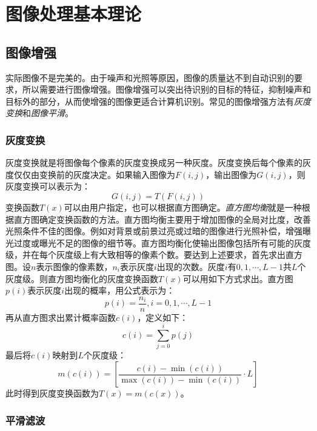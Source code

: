 
\chapter{图像处理基本理论}

\section{图像增强}

实际图像不是完美的。由于噪声和光照等原因，图像的质量达不到自动识别的要求，所以需要进行图像增强。图像增强可以突出待识别的目标的特征，抑制噪声和目标外的部分，从而使增强的图像更适合计算机识别。常见的图像增强方法有\emph{灰度变换}和\emph{图像平滑}。

\subsection{灰度变换}

灰度变换就是将图像每个像素的灰度变换成另一种灰度。灰度变换后每个像素的灰度仅仅由变换前的灰度决定。如果输入图像为$F(i,j)$，输出图像为$G(i,j)$，则灰度变换可以表示为：
\begin{equation}
  G(i,j)=T(F(i,j))
\end{equation}
变换函数$T(x)$可以由用户指定，也可以根据直方图确定。\emph{直方图均衡}就是一种根据直方图确定变换函数的方法。直方图均衡主要用于增加图像的全局对比度，改善光照条件不佳的图像。例如对背景或前景过亮或过暗的图像进行光照补偿，增强曝光过度或曝光不足的图像的细节等。直方图均衡化使输出图像包括所有可能的灰度级，并在每个灰度级上有大致相等的像素个数。要达到上述要求，首先求出直方图。设$n$表示图像的像素数，$n_i$表示灰度$i$出现的次数。灰度$i$有$0,1,\cdots,L-1$共$L$个灰度级。则直方图均衡化的灰度变换函数$T(x)$可以用如下方式求出。直方图$p(i)$表示灰度$i$出现的概率，用公式表示为：
\begin{equation}
  \label{eq:hist}
  p(i)=\frac{n_i}{n},i=0,1,\cdots,L-1
\end{equation}
再从直方图求出累计概率函数$c(i)$，定义如下：
\begin{equation}
  \label{eq:acc}
  c(i)=\sum_{j=0}^i p(j)
\end{equation}
最后将$c(i)$映射到$L$个灰度级：
\begin{equation}
  \label{eq:map}
  m(c(i))=\left[\frac{c(i)-\min(c(i))}{\max(c(i))-\min(c(i))}\cdot L\right]
\end{equation}
此时得到灰度变换函数为$T(x)=m(c(x))$。

\subsection{平滑滤波}

